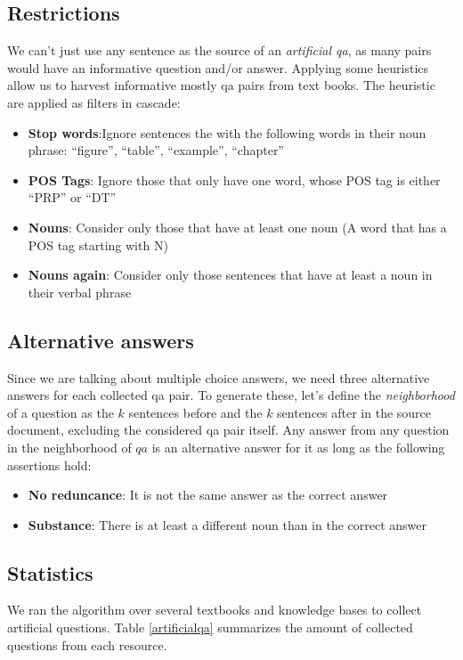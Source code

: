 \subsection{Restrictions}
We can't just use any sentence as the source of an \emph{artificial qa}, as many pairs would have an informative question and/or answer. Applying some heuristics allow us to harvest informative mostly qa pairs from text books. The heuristic are applied as filters in cascade:
\begin{itemize}
\item \textbf{Stop words}:Ignore sentences the with the following words in their noun phrase: ``figure'', ``table'', ``example'', ``chapter''
\item \textbf{POS Tags}: Ignore those that only have one word, whose POS tag is either ``PRP'' or ``DT''
\item \textbf{Nouns}: Consider only those that have at least one noun (A word that has a POS tag starting with N)
\item \textbf{Nouns again}: Consider only those sentences that have at least a noun in their verbal phrase
\end{itemize}

\subsection{Alternative answers}

Since we are talking about multiple choice answers, we need three alternative answers for each collected qa pair. To generate these, let's define the \emph{neighborhood} of a question as the $k$ sentences before and the $k$ sentences after in the source document, excluding the considered qa pair itself. Any answer from any question in the neighborhood of $qa$ is an alternative answer for it as long as the following assertions hold:

\begin{itemize}
\item \textbf{No reduncance}: It is not the same answer as the correct answer
\item \textbf{Substance}: There is at least a different noun than in the correct answer
\end{itemize}

\subsection{Statistics}

We ran the algorithm over several textbooks and knowledge bases to collect artificial questions. Table \ref{artificialqa} summarizes the amount of collected questions from each resource.

